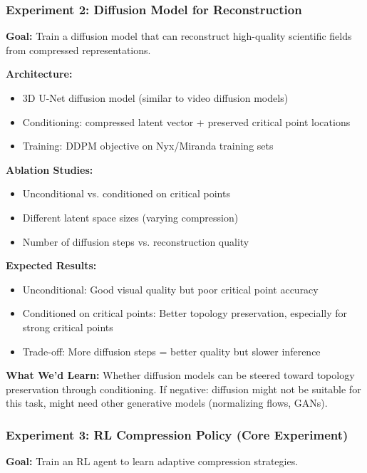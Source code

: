 \documentclass[11pt]{article}
\begin{document}
\subsubsection{Experiment 2: Diffusion Model for Reconstruction}

\textbf{Goal:} Train a diffusion model that can reconstruct high-quality scientific fields from compressed representations.

\textbf{Architecture:}
\begin{itemize}
    \item 3D U-Net diffusion model (similar to video diffusion models)
    \item Conditioning: compressed latent vector + preserved critical point locations
    \item Training: DDPM objective on Nyx/Miranda training sets
\end{itemize}

\textbf{Ablation Studies:}
\begin{itemize}
    \item Unconditional vs. conditioned on critical points
    \item Different latent space sizes (varying compression)
    \item Number of diffusion steps vs. reconstruction quality
\end{itemize}

\textbf{Expected Results:}
\begin{itemize}
    \item Unconditional: Good visual quality but poor critical point accuracy
    \item Conditioned on critical points: Better topology preservation, especially for strong critical points
    \item Trade-off: More diffusion steps = better quality but slower inference
\end{itemize}

\textbf{What We'd Learn:} Whether diffusion models can be steered toward topology preservation through conditioning. If negative: diffusion might not be suitable for this task, might need other generative models (normalizing flows, GANs).

\subsubsection{Experiment 3: RL Compression Policy (Core Experiment)}

\textbf{Goal:} Train an RL agent to learn adaptive compression strategies.
\end{document}
